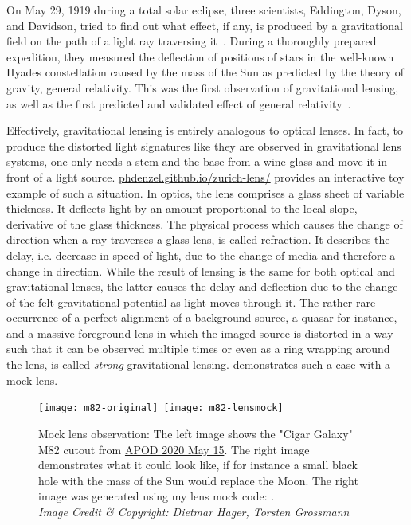 
On May 29, 1919 during a total solar eclipse, three scientists, Eddington,
Dyson, and Davidson, tried to find out what effect, if any, is produced by a
gravitational field on the path of a light ray traversing
it~\cite{Eddington1920}.  During a thoroughly prepared expedition, they measured
the deflection of positions of stars in the well-known Hyades constellation
caused by the mass of the Sun as predicted by the theory of gravity, general
relativity.  This was the first observation of gravitational lensing, as well as
the first predicted and validated effect of general
relativity~\cite{Einstein1911}.

Effectively, gravitational lensing is entirely analogous to optical
lenses. In fact, to produce the distorted light signatures like they
are observed in gravitational lens systems, one only needs a stem and
the base from a wine glass and move it in front of a light source.
\href{https://phdenzel.github.io/zurich-lens/}{phdenzel.github.io/zurich-lens/}
provides an interactive toy example of such a situation.  In optics,
the lens comprises a glass sheet of variable thickness.  It deflects
light by an amount proportional to the local slope, derivative of the
glass thickness.  The physical process which causes the change of
direction when a ray traverses a glass lens, is called refraction.  It
describes the delay, i.e. decrease in speed of light, due to the
change of media and therefore a change in direction.  While the result
of lensing is the same for both optical and gravitational lenses, the
latter causes the delay and deflection due to the change of the felt
gravitational potential as light moves through it.  The rather rare
occurrence of a perfect alignment of a background source, a quasar for
instance, and a massive foreground lens in which the imaged source is
distorted in a way such that it can be observed multiple times or even
as a ring wrapping around the lens, is called \textit{strong}
gravitational lensing.   demonstrates such a case
with a mock lens.
%
\begin{figure}[h]%
    \centering%
    \texttt{[image: m82-original]}\,%
    \texttt{[image: m82-lensmock]}
    \caption[Mock lens image of M82]{Mock lens observation: The left image shows
      the "Cigar Galaxy" M82 cutout from
      \href{https://apod.nasa.gov/apod/ap200515.html}{APOD 2020 May 15}. The
      right image demonstrates what it could look like, if for instance a small
      black hole with the mass of the Sun would replace the Moon.  The right
      image was generated using my lens mock code: 
      \cite{lensing.js}.\\
      \textit{Image Credit \& Copyright: Dietmar Hager, Torsten
        Grossmann}}%
\end{figure}%
%

